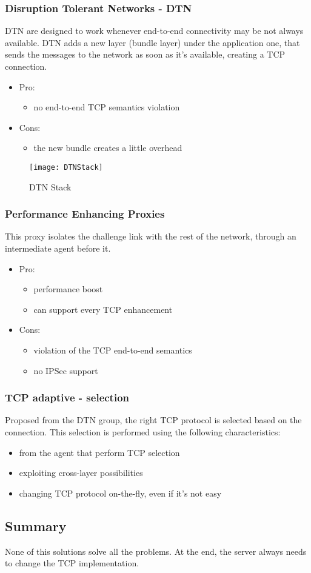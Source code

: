 \subsubsection{Disruption Tolerant Networks - DTN}
DTN are designed to work whenever end-to-end connectivity may be not always
available. DTN adds a new layer (bundle layer) under the application one, that
sends the messages to the network as soon as it's available, creating a TCP
connection.
\begin{itemize}
\item Pro:
  \begin{itemize}
  \item no end-to-end TCP semantics violation
  \end{itemize}
\item Cons:
  \begin{itemize}
  \item the new bundle creates a little overhead
  \end{itemize}
\end{itemize}

\begin{figure}[t]
  \centering
  \texttt{[image: DTNStack]}
  \caption{DTN Stack}
\end{figure}

\subsubsection{Performance Enhancing Proxies}
This proxy isolates the challenge link with the rest of the network, through an
intermediate agent before it.
\begin{itemize}
\item Pro:
  \begin{itemize}
  \item performance boost
  \item can support every TCP enhancement
  \end{itemize}
\item Cons:
  \begin{itemize}
  \item violation of the TCP end-to-end semantics
  \item no IPSec support
  \end{itemize}
\end{itemize}

\subsubsection{TCP adaptive - selection}
Proposed from the DTN group, the right TCP protocol is selected based on the
connection. This selection is performed using the following characteristics:
\begin{itemize}
\item from the agent that perform TCP selection
\item exploiting cross-layer possibilities
\item changing TCP protocol on-the-fly, even if it's not easy
\end{itemize}

\subsection{Summary}
None of this solutions solve all the problems. At the end, the server always
needs to change the TCP implementation.
